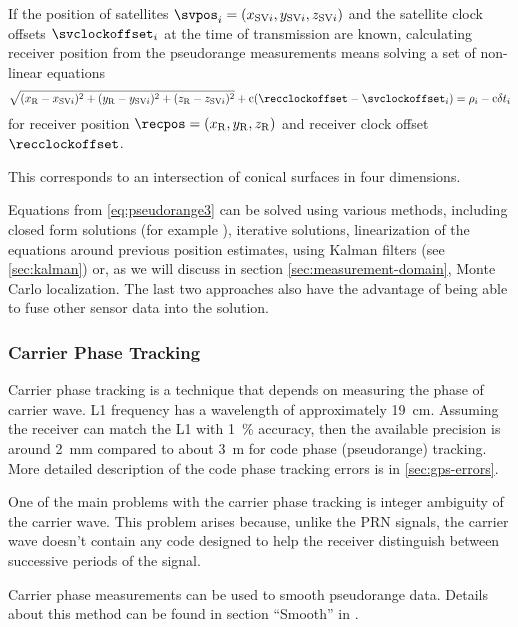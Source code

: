 If the position of satellites \(\svpos_i = \coord{x_{{\SV}i}}{y_{{\SV}i}}{z_{{\SV}i}}\) and the satellite
clock offsets \(\svclockoffset_i\) at the time of transmission are known,
calculating receiver position from the pseudorange measurements means solving a set of non-linear equations
\begin{equation}
	\label{eq:pseudorange3}
	\sqrt{(x_\REC - x_{{\SV}i})^2 + (y_\REC - y_{{\SV}i})^2 +(z_\REC - z_{{\SV}i})^2} +
	\speedoflight (\recclockoffset - \svclockoffset_i)
	=
	\rho_i - \speedoflight\geomrangedelays_i
\end{equation}
for receiver position \(\recpos = \coord{x_\REC}{y_\REC}{z_\REC}\) and receiver clock offset \(\recclockoffset\).

This corresponds to an intersection of conical surfaces in four dimensions.

Equations from \eqref{eq:pseudorange3} can be solved using various methods, including closed form solutions
(for example \cite{leva96}), iterative solutions, linearization of the equations around
previous position estimates, using Kalman filters (see \ref{sec:kalman}) or,
as we will discuss in section \ref{sec:measurement-domain}, Monte Carlo localization.
The last two approaches also have the advantage of being able to fuse other sensor data
into the solution.

\subsubsection{Carrier Phase Tracking}
\label{sec:gps-carrier-phase}

Carrier phase tracking is a technique that depends on measuring the phase of carrier wave.
L1 frequency has a wavelength of approximately \SI{19}{\centi\meter}.
Assuming the receiver can match the L1 with \SI{1}{\percent} accuracy, then the available precision
is around \SI{2}{\milli\meter} compared to about \SI{3}{\meter} for code phase (pseudorange)
tracking. More detailed description of the code phase tracking errors is in \cref{sec:gps-errors}.

One of the main problems with the carrier phase tracking is integer ambiguity of the carrier wave.
This problem arises because, unlike the PRN signals, the carrier wave doesn't contain any code designed to
help the receiver distinguish between successive periods of the signal.

Carrier phase measurements can be used to smooth pseudorange data.
Details about this method can be found in section \enquote{Smooth} in \cite{sam-www}.

